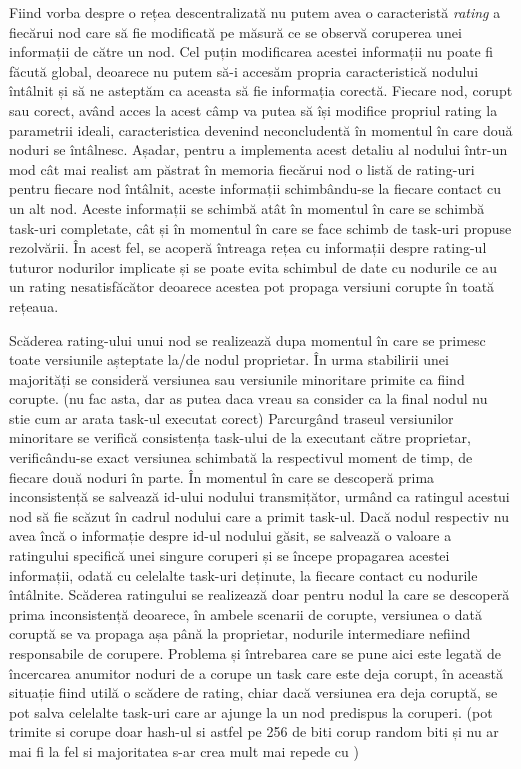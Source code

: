 \documentclass[12pt,a4paper]{report}
\begin{document}
Fiind vorba despre o rețea descentralizată nu putem avea o caracteristă \textit{rating} a fiecărui nod care să fie modificată pe măsură ce se observă coruperea unei informații de către un nod. Cel puțin modificarea acestei informații nu poate fi făcută global, deoarece nu putem să-i accesăm propria caracteristică nodului întâlnit și să ne asteptăm ca aceasta să fie informația corectă. Fiecare nod, corupt sau corect, având acces la acest câmp va putea să își modifice propriul rating la parametrii ideali, caracteristica devenind neconcludentă în momentul în care două noduri se întâlnesc. Așadar, pentru a implementa acest detaliu al nodului într-un mod cât mai realist am păstrat în memoria fiecărui nod o listă de rating-uri pentru fiecare nod întâlnit, aceste informații schimbându-se la fiecare contact cu un alt nod. Aceste informații se schimbă atât în momentul în care se schimbă task-uri completate, cât și în momentul în care se face schimb de task-uri propuse rezolvării. În acest fel, se acoperă întreaga rețea cu informații despre rating-ul tuturor nodurilor implicate și se poate evita schimbul de date cu nodurile ce au un rating nesatisfăcător deoarece acestea pot propaga versiuni corupte în toată rețeaua.

Scăderea rating-ului unui nod se realizează dupa momentul în care se primesc toate versiunile așteptate la/de nodul proprietar. În urma stabilirii unei majorități se consideră versiunea sau versiunile minoritare primite ca fiind corupte. (nu fac asta, dar as putea daca vreau sa consider ca la final nodul nu stie cum ar arata task-ul executat corect) Parcurgând traseul versiunilor minoritare se verifică consistența task-ului de la executant către proprietar, verificându-se exact versiunea schimbată la respectivul moment de timp, de fiecare două noduri în parte. În momentul în care se descoperă prima inconsistență se salvează id-ului nodului transmițător, urmând ca ratingul acestui nod să fie scăzut în cadrul nodului care a primit task-ul. Dacă nodul respectiv nu avea încă o informație despre id-ul nodului găsit, se salvează o valoare a ratingului specifică unei singure coruperi și se începe propagarea acestei informații, odată cu celelalte task-uri deținute, la fiecare contact cu nodurile întâlnite. Scăderea ratingului se realizează doar pentru nodul la care se descoperă prima inconsistență deoarece, în ambele scenarii de corupte, versiunea o dată coruptă se va propaga așa până la proprietar, nodurile intermediare nefiind responsabile de corupere. Problema și întrebarea care se pune aici este legată de încercarea anumitor noduri de a corupe un task care este deja corupt, în această situație fiind utilă o scădere de rating, chiar dacă versiunea era deja coruptă, se pot salva celelalte task-uri care ar ajunge la un nod predispus la coruperi.   (pot trimite si corupe doar hash-ul si astfel pe 256 de biti corup random biti și nu ar mai fi la fel si majoritatea s-ar crea mult mai repede cu )   
\end{document}
